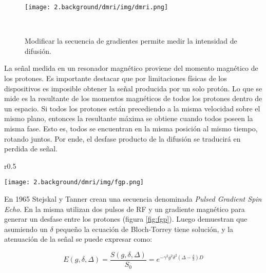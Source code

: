 \begin{figure}
                                                                                                                        
\begin{minipage}[b]{\textwidth}
    \texttt{[image: 2.background/dmri/img/dmri.png]}
    \caption{Modificar la secuencia de gradientes permite medir la
             intensidad de difusi\'on.}
    \label{fig:dmri}
\end{minipage} ~

\end{figure}  

La se\~nal medida en un resonador magn\'etico proviene del 
momento magn\'etico de los protones. Es importante destacar que por
limitaciones f\'isicas de los
dispositivos es imposible obtener la se\~nal producida por un
solo prot\'on. Lo que se mide es la resultante de los momentos magn\'eticos
de todos los protones dentro de un espacio. Si todos los protones est\'an
precediendo a la misma velocidad sobre el mismo plano, entonces la
resultante m\'axima se obtiene cuando todos poseen la misma fase. Esto es,
todos se encuentran en la misma posici\'on al mismo tiempo, rotando
juntos. Por ende, el desfase producto de la difusi\'on se traducir\'a en
perdida de se\~nal.\\

\begin{wrapfigure}{r}{0.5\textwidth}
    \begin{center}
        \vspace{-1cm}
        \texttt{[image: 2.background/dmri/img/fgp.png]}
        \caption{Secuencia Pulsed Gradient Spin Echo.}
        \label{fig:fgp}
    \end{center}
\end{wrapfigure}  

En 1965 Stejskal y Tanner \cite{Stejskal1965} crean una secuencia
denominada \textit{Pulsed Gradient Spin Echo}. En la misma utilizan dos
pulsos de RF y un gradiente magn\'etico para generar un desfase entre los
protones (figura \ref{fig:fgp}). Luego demuestran que asumiendo un $\delta$
peque\~no la ecuaci\'on de Bloch-Torrey tiene soluci\'on, y la atenuaci\'on
de la se\~nal se puede expresar como:

\begin{equation}
    E(g, \delta, \Delta) = 
    \frac{S(g, \delta, \Delta)}{S_0} =
         e^{-\gamma^2 g^2 \delta^2 \left(\Delta - \frac{\delta}{3}\right) D} 
    \label{eq:st}
\end{equation}
  
